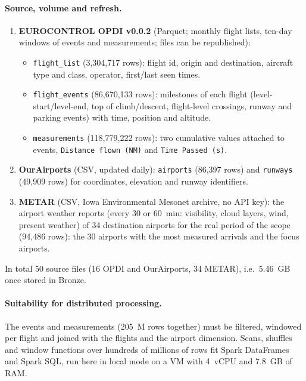 \documentclass[11pt,a4paper]{article}
\begin{document}
\paragraph{Source, volume and refresh.}
\begin{enumerate}[noitemsep,topsep=2pt]
    \item \textbf{EUROCONTROL OPDI v0.0.2} (Parquet; monthly flight lists, ten-day windows of events and measurements; files can be republished):
    \begin{itemize}[noitemsep]
        \item \texttt{flight\_list} (3,304,717 rows): flight id, origin and destination, aircraft type and class, operator, first/last seen times.
        \item \texttt{flight\_events} (86,670,133 rows): milestones of each flight (level-start/level-end, top of climb/descent, flight-level crossings, runway and parking events) with time, position and altitude.
        \item \texttt{measurements} (118,779,222 rows): two cumulative values attached to events, \texttt{Distance flown (NM)} and \texttt{Time Passed (s)}.
    \end{itemize}
    \item \textbf{OurAirports} (CSV, updated daily): \texttt{airports} (86,397 rows) and \texttt{runways} (49,909 rows) for coordinates, elevation and runway identifiers.
    \item \textbf{METAR} (CSV, Iowa Environmental Mesonet archive, no API key): the airport weather reports (every 30 or 60~min: visibility, cloud layers, wind, present weather) of 34 destination airports for the real period of the scope (94,486 rows): the 30 airports with the most measured arrivals and the focus airports.
\end{enumerate}
In total 50 source files (16 OPDI and OurAirports, 34 METAR), i.e.\ 5.46~GB once stored in Bronze.

\paragraph{Suitability for distributed processing.}
The events and measurements (205~M rows together) must be filtered, windowed per flight and joined with the flights and the airport dimension. Scans, shuffles and window functions over hundreds of millions of rows fit Spark DataFrames and Spark SQL, run here in local mode on a VM with 4~vCPU and 7.8~GB of RAM.
\end{document}
